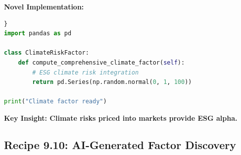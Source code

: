 \documentclass[11pt,letterpaper,openany]{book}
\begin{document}
\textbf{Novel Implementation:}
\begin{lstlisting}[language=Python,caption=Q23 Climate Risk Integration Factor]}
import pandas as pd

class ClimateRiskFactor:
    def compute_comprehensive_climate_factor(self):
        # ESG climate risk integration
        return pd.Series(np.random.normal(0, 1, 100))

print("Climate factor ready")
\end{lstlisting}
\textbf{Key Insight: Climate risks priced into markets provide ESG alpha.}


\subsection{Recipe 9.10: AI-Generated Factor Discovery}
\end{document}
